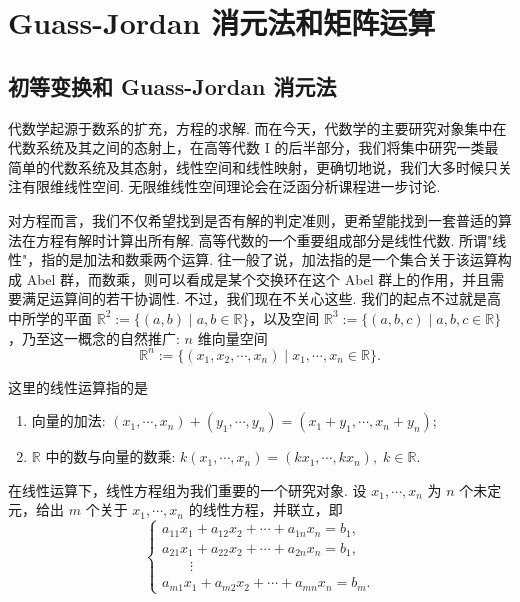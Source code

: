 \documentclass[10pt,openany]{article}
\theoremstyle{thmstyle} %
\theoremstyle{defstyle} %
\theoremstyle{prostyle} %
\begin{document}
\pagestyle{fancy}
\rhead{\today}

\section{Guass-Jordan 消元法和矩阵运算}
\subsection{初等变换和 Guass-Jordan 消元法}
\label{1.1}
代数学起源于数系的扩充，方程的求解. 而在今天，代数学的主要研究对象集中在代数系统及其之间的态射上，在高等代数 I 的后半部分，我们将集中研究一类最简单的代数系统及其态射，线性空间和线性映射，更确切地说，我们大多时候只关注有限维线性空间. 无限维线性空间理论会在泛函分析课程进一步讨论.

对方程而言，我们不仅希望找到是否有解的判定准则，更希望能找到一套普适的算法在方程有解时计算出所有解. 高等代数的一个重要组成部分是线性代数. 所谓"线性"，指的是加法和数乘两个运算. 往一般了说，加法指的是一个集合关于该运算构成 Abel 群，而数乘，则可以看成是某个交换环在这个 Abel 群上的作用，并且需要满足运算间的若干协调性. 不过，我们现在不关心这些. 我们的起点不过就是高中所学的平面 \( \mathbb{R}^2:=\{(a,b) \mid a,b \in \mathbb{R} \} \)，以及空间 \( \mathbb{R}^3:=\{ (a,b,c) \mid a,b,c \in \mathbb{R} \} \)，乃至这一概念的自然推广: \( n \) 维向量空间
\[ \mathbb{R}^n:=\{ (x_1,x_2,\cdots,x_n) \mid x_1,\cdots,x_n \in \mathbb{R} \}. \]

这里的线性运算指的是
\begin{enumerate}[(1)]
	\item 向量的加法: \( (x_1,\cdots,x_n)+(y_1,\cdots,y_n)=(x_1+y_1,\cdots,x_n+y_n) \);
	\item \( \mathbb{R} \) 中的数与向量的数乘: \( k(x_1,\cdots,x_n)=(kx_1,\cdots,kx_n), \; k \in \mathbb{R} \).
\end{enumerate} 

在线性运算下，线性方程组为我们重要的一个研究对象. 设 \( x_1,\cdots,x_n \) 为 \( n \) 个未定元，给出 \( m \) 个关于 \( x_1,\cdots,x_n \) 的线性方程，并联立，即
\begin{equation}
	\left\{\begin{array}{l}
		a_{11}x_1+a_{12}x_2+\cdots+a_{1n}x_n=b_1, \\
		a_{21}x_1+a_{22}x_2+\cdots+a_{2n}x_n=b_1, \\
		\qquad \vdots \\
		a_{m1}x_1+a_{m2}x_2+\cdots+a_{mn}x_n=b_m.
	\end{array}\right.
	\label{linequ.}
\end{equation}
\end{document}
